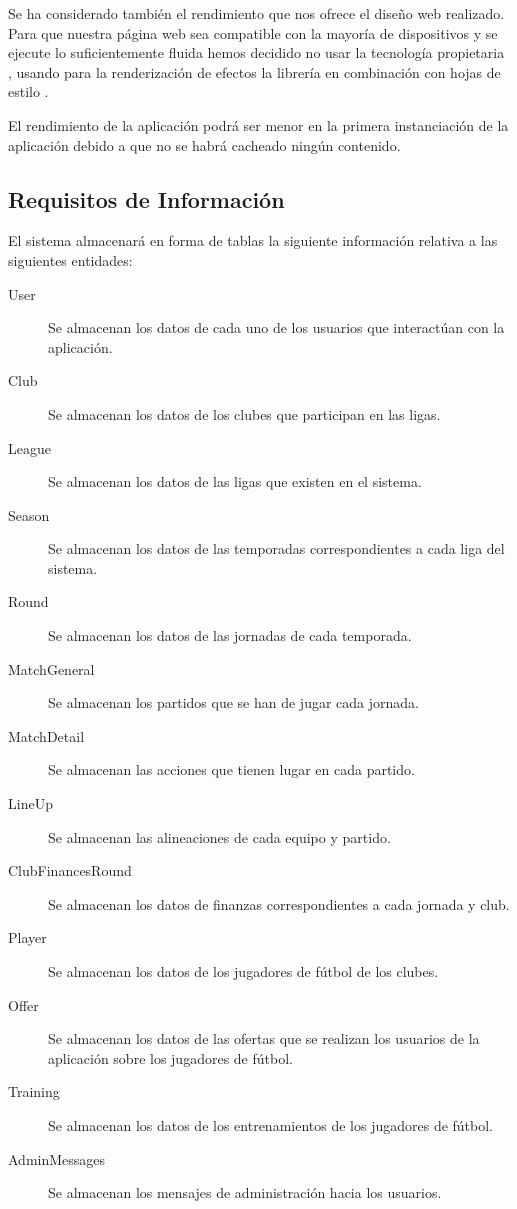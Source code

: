 Se ha considerado también el rendimiento que nos ofrece el diseño web realizado. Para que nuestra
página web sea compatible con la mayoría de dispositivos y se ejecute lo suficientemente fluida hemos
decidido no usar la tecnología propietaria , usando para la renderización de efectos la librería
 en combinación con hojas de estilo .

El rendimiento de la aplicación podrá ser menor en la primera instanciación de la aplicación debido a
que no se habrá cacheado ningún contenido.

\subsection{Requisitos de Información}
El sistema almacenará en forma de tablas la siguiente información relativa a las
siguientes entidades:

\begin{description}
\item[User] Se almacenan los datos de cada uno de los usuarios que
  interactúan con la aplicación.
\item[Club] Se almacenan los datos de los clubes que participan en
  las ligas.
\item[League] Se almacenan los datos de las ligas que existen en el
  sistema.
\item[Season] Se almacenan los datos de las temporadas
  correspondientes a cada liga del sistema.
\item[Round] Se almacenan los datos de las jornadas de cada
  temporada.
\item[MatchGeneral] Se almacenan los partidos que se han de jugar
  cada jornada.
\item[MatchDetail] Se almacenan las acciones que tienen lugar en cada
  partido.
\item[LineUp] Se almacenan las alineaciones de cada equipo y partido.
\item[ClubFinancesRound] Se almacenan los datos de finanzas
  correspondientes a cada jornada y club.
\item[Player] Se almacenan los datos de los jugadores de fútbol de
  los clubes.
\item[Offer] Se almacenan los datos de las ofertas que se realizan
  los usuarios de la aplicación sobre los jugadores de fútbol.
\item[Training] Se almacenan los datos de los entrenamientos de los
  jugadores de fútbol.
\item[AdminMessages] Se almacenan los mensajes de administración
  hacia los usuarios.
\end{description}

